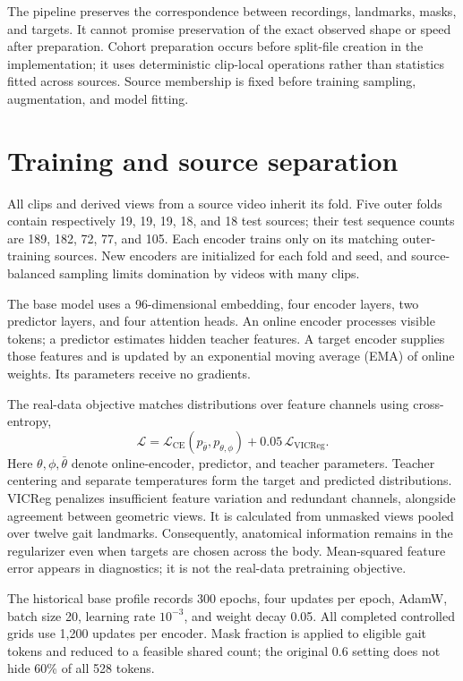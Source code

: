 \documentclass{article}
\begin{document}
The pipeline preserves the correspondence between recordings, landmarks, masks, and targets. It cannot promise preservation of the exact observed shape or speed after preparation. Cohort preparation occurs before split-file creation in the implementation; it uses deterministic clip-local operations rather than statistics fitted across sources. Source membership is fixed before training sampling, augmentation, and model fitting.

\section{Training and source separation}\label{training-and-source-separation}

All clips and derived views from a source video inherit its fold. Five outer folds contain respectively 19, 19, 19, 18, and 18 test sources; their test sequence counts are 189, 182, 72, 77, and 105. Each encoder trains only on its matching outer-training sources. New encoders are initialized for each fold and seed, and source-balanced sampling limits domination by videos with many clips.

The base model uses a 96-dimensional embedding, four encoder layers, two predictor layers, and four attention heads. An online encoder processes visible tokens; a predictor estimates hidden teacher features. A target encoder supplies those features and is updated by an exponential moving average (EMA) of online weights. Its parameters receive no gradients.

The real-data objective matches distributions over feature channels using cross-entropy, \[
\mathcal L=\mathcal L_{\mathrm{CE}}(p_{\bar\theta},p_{\theta,\phi})
+0.05\,\mathcal L_{\mathrm{VICReg}}.
\] Here \(\theta,\phi,\bar\theta\) denote online-encoder, predictor, and teacher parameters. Teacher centering and separate temperatures form the target and predicted distributions. VICReg penalizes insufficient feature variation and redundant channels, alongside agreement between geometric views. It is calculated from unmasked views pooled over twelve gait landmarks. Consequently, anatomical information remains in the regularizer even when targets are chosen across the body. Mean-squared feature error appears in diagnostics; it is not the real-data pretraining objective.

The historical base profile records 300 epochs, four updates per epoch, AdamW, batch size 20, learning rate \(10^{-3}\), and weight decay 0.05. All completed controlled grids use 1,200 updates per encoder. Mask fraction is applied to eligible gait tokens and reduced to a feasible shared count; the original 0.6 setting does not hide 60\% of all 528 tokens.
\end{document}
